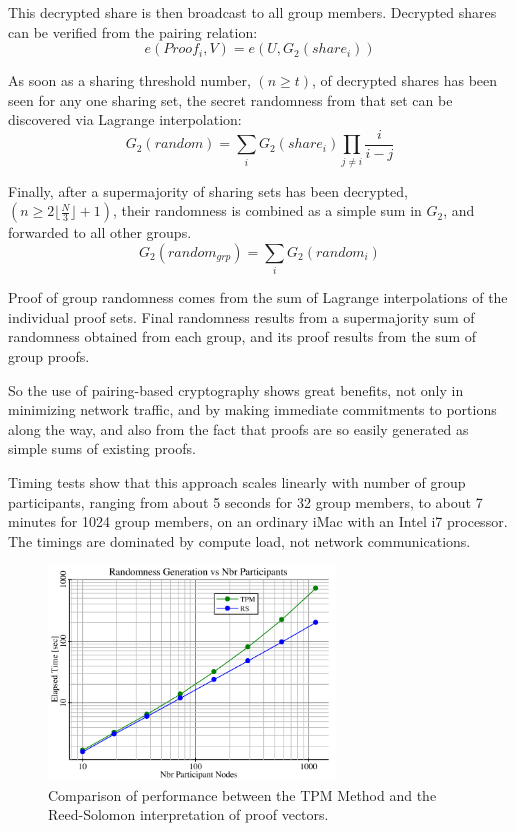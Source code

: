 \documentclass{yellowpaper}
\begin{document}
This decrypted share is then broadcast to all group members. Decrypted shares can be verified from the pairing relation:
$$ e(Proof_i, V) = e(U, G_2(share_i))$$

As soon as a sharing threshold number, $(n \ge t)$, of decrypted shares has been seen for any one sharing set, the secret randomness from that set can be discovered via Lagrange interpolation:
$$G_2(random) = \sum_i G_2(share_i) \prod_{j \ne i} \frac{i}{i-j}$$

Finally, after a supermajority of sharing sets has been decrypted, $(n \ge 2 \lfloor \frac{N}{3} \rfloor + 1)$, their randomness is combined as a simple sum in $G_2$, and forwarded to all other groups.
$$G_2(random_{grp}) = \sum_i G_2(random_i)$$

Proof of group randomness comes from the sum of Lagrange interpolations of the individual proof sets.
Final randomness results from a supermajority sum of randomness obtained from each group, and its proof results from the sum of group proofs. 

So the use of pairing-based cryptography shows great benefits, not only in minimizing network traffic, and by making immediate commitments to portions along the way, and also from the fact that proofs are so easily generated as simple sums of existing proofs.

Timing tests show that this approach scales linearly with number of group participants, ranging from about 5 seconds for 32 group members, to about 7 minutes for 1024 group members, on an ordinary iMac with an Intel i7 processor. The timings are dominated by compute load, not network communications.

\begin{figure}[h!]
  \centering
  \includegraphics[width=3in]{randtimings}
  \caption{ Comparison of performance between the TPM Method and the Reed-Solomon interpretation of proof vectors.}
  \label{fig:randtimings}
\end{figure}
\end{document}
